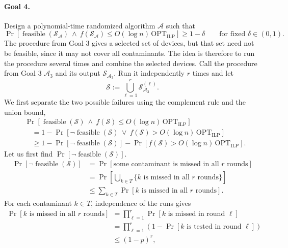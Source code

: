 \documentclass[12pt,a4paper]{article}
\begin{document}
\paragraph{Goal 4.}
Design a polynomial-time randomized algorithm $\mathcal{A}$ such that
\[
\Pr\!\left[
\operatorname{feasible}(\mathcal{S}_{\mathcal{A}})
\ \land\
f(\mathcal{S}_{\mathcal{A}})
\leq O(\log n)\,\mathrm{OPT}_{\mathrm{ILP}}
\right]\geq1-\delta
\qquad\text{for fixed }\delta\in(0,1).
\]
The procedure from Goal 3 gives a selected set of devices, but that set
need not be feasible, since it may not cover all contaminants. The idea
is therefore to run the procedure several times and combine the selected
devices. Call the procedure from Goal 3 $\mathcal{A}_3$ and its output
$\mathcal{S}_{\mathcal{A}_3}$. Run it independently $r$ times and let
\[
\mathcal{S}:=\bigcup_{\ell=1}^r\mathcal{S}_{\mathcal{A}_3}^{(\ell)}.
\]
We first separate the two possible failures using the complement rule
and the union bound,
\begin{equation}
\tag{*}\label{eq:water-quality-joint-failure}
\begin{aligned}
&\Pr\!\left[\operatorname{feasible}(\mathcal{S})
\ \land\ f(\mathcal{S})\leq O(\log n)\,\mathrm{OPT}_{\mathrm{ILP}}\right]\\
&\quad=1-\Pr\!\left[\neg\operatorname{feasible}(\mathcal{S})
\ \lor\ f(\mathcal{S})>O(\log n)\,\mathrm{OPT}_{\mathrm{ILP}}\right]\\
&\quad\geq1-\Pr[\neg\operatorname{feasible}(\mathcal{S})]
-\Pr\!\left[f(\mathcal{S})>O(\log n)\,\mathrm{OPT}_{\mathrm{ILP}}\right].
\end{aligned}
\end{equation}
Let us first find $\Pr[\neg\operatorname{feasible}(\mathcal{S})]$.
\[
\begin{aligned}
\Pr[\neg\operatorname{feasible}(\mathcal{S})]
&=\Pr[\text{some contaminant is missed in all }r\text{ rounds}]\\
&=\Pr\!\left[\bigcup_{k\in T}
\{k\text{ is missed in all }r\text{ rounds}\}\right]\\
&\leq\sum_{k\in T}\Pr[k\text{ is missed in all }r\text{ rounds}].
\end{aligned}
\]
For each contaminant $k\in T$, independence of the runs gives
\[
\begin{aligned}
\Pr[k\text{ is missed in all }r\text{ rounds}]
&=\prod_{\ell=1}^r\Pr[k\text{ is missed in round }\ell]\\
&=\prod_{\ell=1}^r\left(1-\Pr[k\text{ is tested in round }\ell]\right)\\
&\leq(1-p)^r,
\end{aligned}
\]
\end{document}
